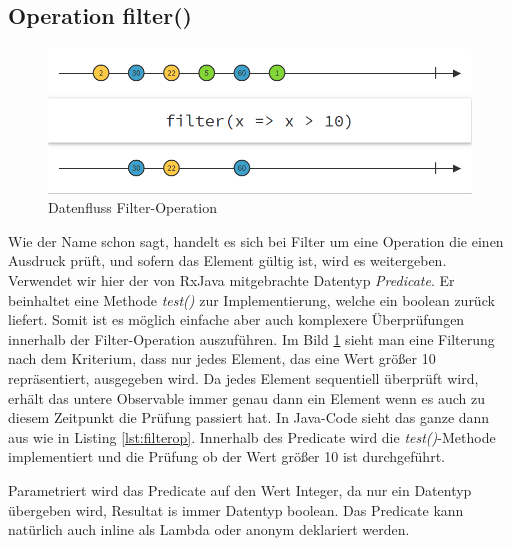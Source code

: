 \subsection{Operation filter()}
\begin{figure}[hbt]
	\centering
	\includegraphics[width=1\textwidth]{Abb/filter}
	\caption{Datenfluss Filter-Operation}
	\label{pic:filter}
\end{figure}
Wie der Name schon sagt, handelt es sich bei Filter um eine Operation die einen Ausdruck prüft, und sofern das Element gültig ist, wird es weitergeben. Verwendet wir hier der von RxJava mitgebrachte Datentyp \textit{Predicate}. Er beinhaltet eine Methode \textit{test()} zur Implementierung, welche ein boolean zurück liefert. Somit ist es möglich einfache aber auch komplexere Überprüfungen innerhalb der Filter-Operation auszuführen. Im Bild \ref{pic:filter} sieht man eine Filterung nach dem Kriterium, dass nur jedes Element, das eine Wert größer 10 repräsentiert, ausgegeben wird. Da jedes Element sequentiell überprüft wird, erhält das untere Observable immer genau dann ein Element wenn es auch zu diesem Zeitpunkt die Prüfung passiert hat. In Java-Code sieht das ganze dann aus wie in Listing \ref{lst:filterop}. Innerhalb des Predicate wird die \textit{test()}-Methode implementiert und die Prüfung ob der Wert größer 10 ist durchgeführt. 
 
Parametriert wird das Predicate auf den Wert Integer, da nur ein Datentyp übergeben wird, Resultat is immer Datentyp boolean. Das Predicate kann natürlich auch inline als Lambda oder anonym deklariert werden.
